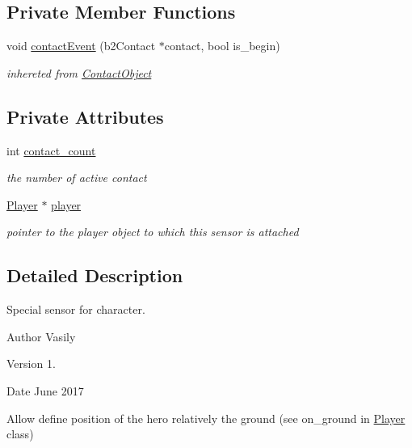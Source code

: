 \subsection*{Private Member Functions}
\begin{DoxyCompactItemize}
\item 
\mbox{\label{class_player_sensor_a6977b8699ebf0d3d2d2b177665060f21}} 
void \hyperlink{class_player_sensor_a6977b8699ebf0d3d2d2b177665060f21}{contact\+Event} (b2\+Contact $\ast$contact, bool is\+\_\+begin)
\begin{DoxyCompactList}\small\item\em inhereted from \hyperlink{class_contact_object}{Contact\+Object} \end{DoxyCompactList}\end{DoxyCompactItemize}
\subsection*{Private Attributes}
\begin{DoxyCompactItemize}
\item 
\mbox{\label{class_player_sensor_afd6fd57380fc1752edbd601566e52980}} 
int \hyperlink{class_player_sensor_afd6fd57380fc1752edbd601566e52980}{contact\+\_\+count}
\begin{DoxyCompactList}\small\item\em the number of active contact \end{DoxyCompactList}\item 
\mbox{\label{class_player_sensor_a28ca9f490022e0473064290956fe6852}} 
\hyperlink{class_player}{Player} $\ast$ \hyperlink{class_player_sensor_a28ca9f490022e0473064290956fe6852}{player}
\begin{DoxyCompactList}\small\item\em pointer to the player object to which this sensor is attached \end{DoxyCompactList}\end{DoxyCompactItemize}


\subsection{Detailed Description}
Special sensor for character. 

\begin{DoxyAuthor}{Author}
Vasily 
\end{DoxyAuthor}
\begin{DoxyVersion}{Version}
1. 
\end{DoxyVersion}
\begin{DoxyDate}{Date}
June 2017
\end{DoxyDate}
Allow define position of the hero relatively the ground (see on\+\_\+ground in \hyperlink{class_player}{Player} class) 


